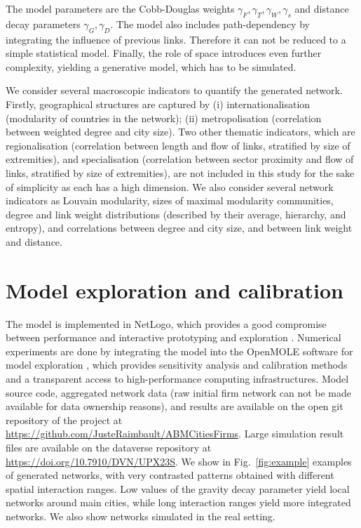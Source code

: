 \documentclass[11pt]{article}
\begin{document}
The model parameters are the Cobb-Douglas weights $\gamma_F,\gamma_T,\gamma_W,\gamma_s$ and distance decay parameters $\gamma_G,\gamma_D$. The model also includes path-dependency by integrating the influence of previous links. Therefore it can not be reduced to a simple statistical model. Finally, the role of space introduces even further complexity, yielding a generative model, which has to be simulated.

We consider several macroscopic indicators to quantify the generated network. Firstly, geographical structures are captured by (i) internationalisation (modularity of countries in the network); (ii) metropolisation (correlation between weighted degree and city size). Two other thematic indicators, which are regionalisation (correlation between length and flow of links, stratified by size of extremities), and specialisation (correlation between sector proximity and flow of links, stratified by size of extremities), are not included in this study for the sake of simplicity as each has a high dimension. We also consider several network indicators as Louvain modularity, sizes of maximal modularity communities, degree and link weight distributions (described by their average, hierarchy, and entropy), and correlations between degree and city size, and between link weight and distance.



\section{Model exploration and calibration}

The model is implemented in NetLogo, which provides a good compromise between performance and interactive prototyping and exploration \cite{railsback2017improving}. Numerical experiments are done by integrating the model into the OpenMOLE software for model exploration \cite{reuillon2013openmole}, which provides sensitivity analysis and calibration methods and a transparent access to high-performance computing infrastructures. Model source code, aggregated network data (raw initial firm network can not be made available for data ownership reasons), and results are available on the open git repository of the project at \url{https://github.com/JusteRaimbault/ABMCitiesFirms}. Large simulation result files are available on the dataverse repository at \url{https://doi.org/10.7910/DVN/UPX23S}. We show in Fig.~\ref{fig:example} examples of generated networks, with very contrasted patterns obtained with different spatial interaction ranges. Low values of the gravity decay parameter yield local networks around main cities, while long interaction ranges yield more integrated networks. We also show networks simulated in the real setting.
\end{document}
